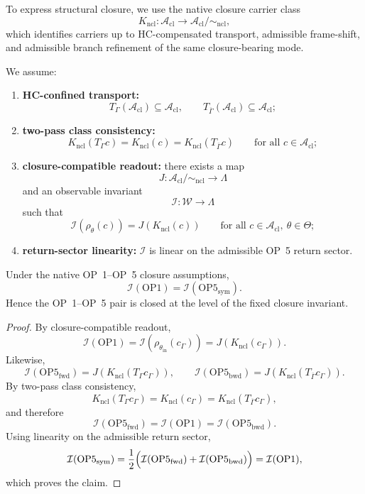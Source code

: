 To express structural closure, we use the native closure carrier class
\[
K_{\mathrm{ncl}}:\mathcal{A}_{\mathrm{cl}}\to \mathcal{A}_{\mathrm{cl}}/\!\sim_{\mathrm{ncl}},
\]
which identifies carriers up to HC-compensated transport, admissible frame-shift, and admissible branch refinement of the same closure-bearing mode.

\begin{assumption}
We assume:
\begin{enumerate}[leftmargin=2em,label=(\roman*)]
\item \textbf{HC-confined transport:}
\[
T_{\Gamma}(\mathcal{A}_{\mathrm{cl}})\subseteq \mathcal{A}_{\mathrm{cl}},
\qquad
T_{\overline{\Gamma}}(\mathcal{A}_{\mathrm{cl}})\subseteq \mathcal{A}_{\mathrm{cl}};
\]

\item \textbf{two-pass class consistency:}
\[
K_{\mathrm{ncl}}(T_{\Gamma}c)=K_{\mathrm{ncl}}(c)=K_{\mathrm{ncl}}(T_{\overline{\Gamma}}c)
\qquad
\text{for all } c\in\mathcal{A}_{\mathrm{cl}};
\]

\item \textbf{closure-compatible readout:} there exists a map
\[
J:\mathcal{A}_{\mathrm{cl}}/\!\sim_{\mathrm{ncl}}\to\Lambda
\]
and an observable invariant
\[
\mathcal{I}:\mathcal{W}\to\Lambda
\]
such that
\[
\mathcal{I}(\rho_{\theta}(c))=J(K_{\mathrm{ncl}}(c))
\qquad
\text{for all } c\in\mathcal{A}_{\mathrm{cl}},\ \theta\in\Theta;
\]

\item \textbf{return-sector linearity:} $\mathcal{I}$ is linear on the admissible OP~5 return sector.
\end{enumerate}
\end{assumption}

\begin{theorem}\label{thm:op15-closure}
Under the native OP~1--OP~5 closure assumptions,
\[
\mathcal{I}(\mathrm{OP1})
=
\mathcal{I}(\mathrm{OP5}_{\mathrm{sym}}).
\]
Hence the OP~1--OP~5 pair is closed at the level of the fixed closure invariant.
\end{theorem}

\begin{proof}
By closure-compatible readout,
\[
\mathcal{I}(\mathrm{OP1})
=
\mathcal{I}\!\left(\rho_{\theta_{\mathrm{in}}}(c_{\Gamma})\right)
=
J(K_{\mathrm{ncl}}(c_{\Gamma})).
\]
Likewise,
\[
\mathcal{I}(\mathrm{OP5}_{\mathrm{fwd}})
=
J(K_{\mathrm{ncl}}(T_{\Gamma}c_{\Gamma})),
\qquad
\mathcal{I}(\mathrm{OP5}_{\mathrm{bwd}})
=
J(K_{\mathrm{ncl}}(T_{\overline{\Gamma}}c_{\Gamma})).
\]
By two-pass class consistency,
\[
K_{\mathrm{ncl}}(T_{\Gamma}c_{\Gamma})
=
K_{\mathrm{ncl}}(c_{\Gamma})
=
K_{\mathrm{ncl}}(T_{\overline{\Gamma}}c_{\Gamma}),
\]
and therefore
\[
\mathcal{I}(\mathrm{OP5}_{\mathrm{fwd}})
=
\mathcal{I}(\mathrm{OP1})
=
\mathcal{I}(\mathrm{OP5}_{\mathrm{bwd}}).
\]
Using linearity on the admissible return sector,
\[
\mathcal{I}(\mathrm{OP5}_{\mathrm{sym}})
=
\frac12\Bigl(
\mathcal{I}(\mathrm{OP5}_{\mathrm{fwd}})
+
\mathcal{I}(\mathrm{OP5}_{\mathrm{bwd}})
\Bigr)
=
\mathcal{I}(\mathrm{OP1}),
\]
which proves the claim.
\end{proof}

